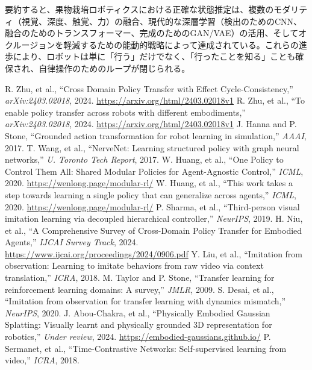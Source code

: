 \documentclass[a4paper,fleqn,10pt,twocolumn]{template_v1.0}
\begin{document}
要約すると、果物栽培ロボティクスにおける正確な状態推定は、複数のモダリティ（視覚、深度、触覚、力）の融合、現代的な深層学習（検出のためのCNN、融合のためのトランスフォーマー、完成のためのGAN/VAE）の活用、そしてオクルージョンを軽減するための能動的戦略によって達成されている。これらの進歩により、ロボットは単に「行う」だけでなく、「行ったことを知る」ことも確保され、自律操作のためのループが閉じられる。

\begin{thebibliography}{99}
R. Zhu, et al., ``Cross Domain Policy Transfer with Effect Cycle-Consistency,'' {\it arXiv:2403.02018}, 2024. \url{https://arxiv.org/html/2403.02018v1}
R. Zhu, et al., ``To enable policy transfer across robots with different embodiments,'' {\it arXiv:2403.02018}, 2024. \url{https://arxiv.org/html/2403.02018v1}
J. Hanna and P. Stone, ``Grounded action transformation for robot learning in simulation,'' {\it AAAI}, 2017.
T. Wang, et al., ``NerveNet: Learning structured policy with graph neural networks,'' {\it U. Toronto Tech Report}, 2017.
W. Huang, et al., ``One Policy to Control Them All: Shared Modular Policies for Agent-Agnostic Control,'' {\it ICML}, 2020. \url{https://wenlong.page/modular-rl/}
W. Huang, et al., ``This work takes a step towards learning a single policy that can generalize across agents,'' {\it ICML}, 2020. \url{https://wenlong.page/modular-rl/}
P. Sharma, et al., ``Third-person visual imitation learning via decoupled hierarchical controller,'' {\it NeurIPS}, 2019.
H. Niu, et al., ``A Comprehensive Survey of Cross-Domain Policy Transfer for Embodied Agents,'' {\it IJCAI Survey Track}, 2024. \url{https://www.ijcai.org/proceedings/2024/0906.pdf}
Y. Liu, et al., ``Imitation from observation: Learning to imitate behaviors from raw video via context translation,'' {\it ICRA}, 2018.
M. Taylor and P. Stone, ``Transfer learning for reinforcement learning domains: A survey,'' {\it JMLR}, 2009.
S. Desai, et al., ``Imitation from observation for transfer learning with dynamics mismatch,'' {\it NeurIPS}, 2020.
J. Abou-Chakra, et al., ``Physically Embodied Gaussian Splatting: Visually learnt and physically grounded 3D representation for robotics,'' {\it Under review}, 2024. \url{https://embodied-gaussians.github.io/}
P. Sermanet, et al., ``Time-Contrastive Networks: Self-supervised learning from video,'' {\it ICRA}, 2018.

\end{thebibliography}
\end{document}

